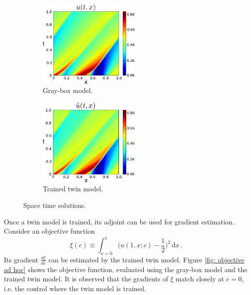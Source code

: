 \begin{figure}[htbp]\begin{center}
    \begin{subfigure}[t]{.4\textwidth}
        \centering
        \includegraphics[width=5cm]{../leftcol.png}
        \caption{Gray-box model.}
        \label{fig: leftcol}
    \end{subfigure}
    \begin{subfigure}[t]{.4\textwidth}
        \centering
        \includegraphics[width=5cm]{../rightcol.png}
        \caption{Trained twin model.}
        \label{fig: rightcol}
    \end{subfigure}
    \caption{Space time solutions.}
\end{center}\end{figure}

Once a twin model is trained, its adjoint can be used for gradient estimation.
Consider an objective function 
\begin{equation}
    \xi(c) \equiv \int_{x=0}^1 \big(u(1,x; c) - \frac{1}{2}\big)^2 \,\textrm{d}x\,.
    \label{eqn: objective ad hoc}
\end{equation}
Its gradient $\frac{d\xi}{dc}$ can be estimated by the trained twin model.
Figure \ref{fig: objective ad hoc} shows the objective function, evaluated using 
the gray-box model and the trained twin model. It is observed that the gradients of $\xi$
match closely at $c=0$, i.e. the control where the twin model is trained.\\


